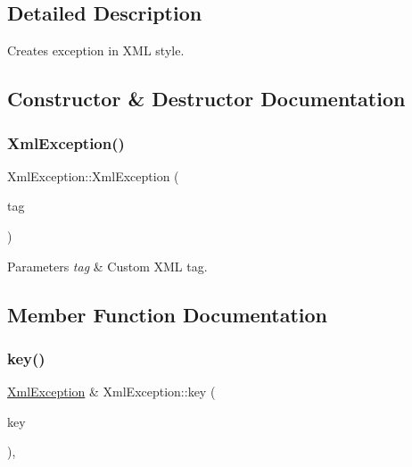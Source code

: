 \subsection{Detailed Description}
Creates exception in X\+ML style. 

\subsection{Constructor \& Destructor Documentation}
\mbox{\label{classXmlException_a912e299d8bfb810f42a2d4c95621b221}} 
\subsubsection{\texorpdfstring{Xml\+Exception()}{XmlException()}}
{\footnotesize\ttfamily Xml\+Exception\+::\+Xml\+Exception (\begin{DoxyParamCaption}\item[{const Q\+String \&}]{tag }\end{DoxyParamCaption})\hspace{0.3cm}{\ttfamily [explicit]}}


\begin{DoxyParams}{Parameters}
{\em tag} & Custom X\+ML tag. \\
\hline
\end{DoxyParams}


\subsection{Member Function Documentation}
\mbox{\label{classXmlException_a6a357f5a13ec354b84fb17ca5b5003a0}} 
\subsubsection{\texorpdfstring{key()}{key()}}
{\footnotesize\ttfamily \hyperlink{classXmlException}{Xml\+Exception} \& Xml\+Exception\+::key (\begin{DoxyParamCaption}\item[{const Q\+String \&}]{key }\end{DoxyParamCaption})\hspace{0.3cm}{\ttfamily [override]}, {\ttfamily [virtual]}}


